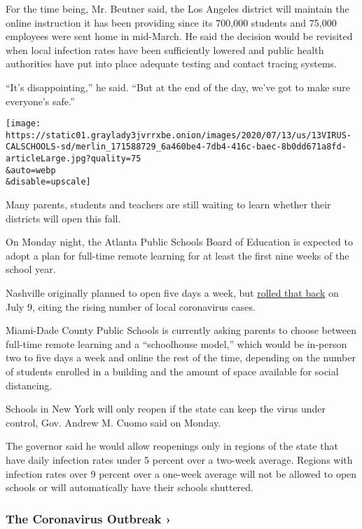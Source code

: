 For the time being, Mr. Beutner said, the Los Angeles district will
maintain the online instruction it has been providing since its 700,000
students and 75,000 employees were sent home in mid-March. He said the
decision would be revisited when local infection rates have been
sufficiently lowered and public health authorities have put into place
adequate testing and contact tracing systems.

``It's disappointing,'' he said. ``But at the end of the day, we've got
to make sure everyone's safe.''

\texttt{[image: https://static01.graylady3jvrrxbe.onion/images/2020/07/13/us/13VIRUS-CALSCHOOLS-sd/merlin\_171588729\_6a460be4-7db4-416c-baec-8b0dd671a8fd-articleLarge.jpg?quality=75\\\&auto=webp\\\&disable=upscale]}

Many parents, students and teachers are still waiting to learn whether
their districts will open this fall.

On Monday night, the Atlanta Public Schools Board of Education is
expected to adopt a plan for full-time remote learning for at least the
first nine weeks of the school year.

Nashville originally planned to open five days a week, but
\href{https://www.tennessean.com/story/news/education/2020/07/09/metro-schools-academic-year-start-online-nashville-students/5383315002/}{rolled
that back} on July 9, citing the rising number of local coronavirus
cases.

Miami-Dade County Public Schools is currently asking parents to choose
between full-time remote learning and a ``schoolhouse model,'' which
would be in-person two to five days a week and online the rest of the
time, depending on the number of students enrolled in a building and the
amount of space available for social distancing.

Schools in New York will only reopen if the state can keep the virus
under control, Gov. Andrew M. Cuomo said on Monday.

The governor said he would allow reopenings only in regions of the state
that have daily infection rates under 5 percent over a two-week average.
Regions with infection rates over 9 percent over a one-week average will
not be allowed to open schools or will automatically have their schools
shuttered.

\href{https://www.nytimes3xbfgragh.onion/news-event/coronavirus?action=click\&pgtype=Article\&state=default\&region=MAIN_CONTENT_3\&context=storylines_faq}{}

\hypertarget{the-coronavirus-outbreak-}{%
\subsubsection{The Coronavirus Outbreak
›}\label{the-coronavirus-outbreak-}}


